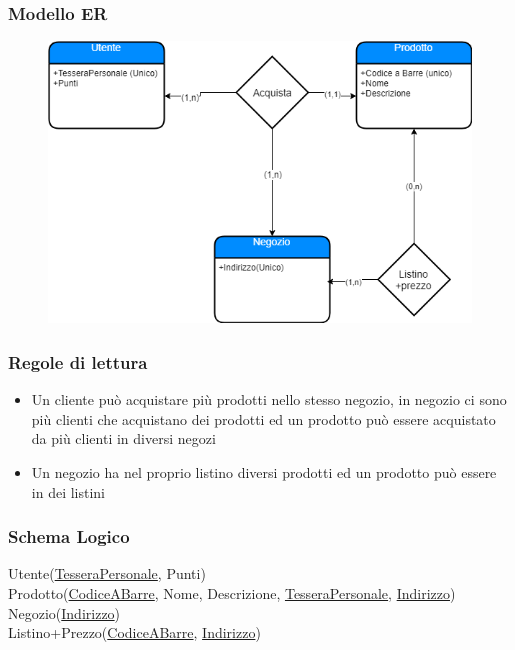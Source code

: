 \documentclass{article}
\begin{document}
	\subsubsection{Modello ER}
	\begin{figure}[h!]
		\centering
		\includegraphics[scale=0.5]{images/AnalisiConsumi.png}
	\end{figure}
	\subsubsection{Regole di lettura}
	\begin{itemize}
		\item Un cliente può acquistare più prodotti nello stesso negozio, in negozio ci sono più clienti che acquistano dei prodotti ed un prodotto può essere acquistato da più clienti in diversi negozi
		\item Un negozio ha nel proprio listino diversi prodotti ed un prodotto può essere in dei listini
	\end{itemize}
	\subsubsection{Schema Logico}
	Utente(\underline{TesseraPersonale}, Punti)\\
	Prodotto(\underline{CodiceABarre}, Nome, Descrizione, \underline{TesseraPersonale}, \underline{Indirizzo})\\
	Negozio(\underline{Indirizzo})\\
	Listino+Prezzo(\underline{CodiceABarre}, \underline{Indirizzo})\\
\end{document}

